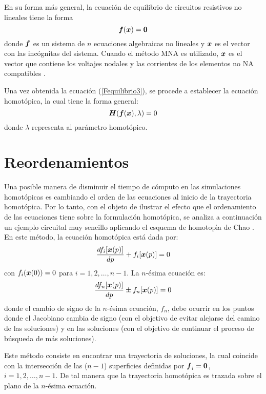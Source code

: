 \documentclass[conference,letterpaper,onecolumn]{IEEEtran}
\newcommand{\pig}[1]{\mbox{\boldmath ${#1}$}	}
\begin{document}
En su forma m\'as general, la ecuaci\'on de equilibrio de circuitos
resistivos no lineales tiene la forma
\begin{equation}
\pig{f}(\pig{x})=\pig{0}
\label{Fequilibrio3}
\end{equation}
donde $\pig{f}$ es un sistema de $n$ ecuaciones algebraicas no lineales
y $\pig{x}$  es el vector con las inc\'ognitas del sistema. Cuando el
m\'etodo MNA es utilizado, $\pig{x}$ es el vector que contiene los
voltajes nodales y las corrientes de los elementos no NA compatibles
\cite{Schwa_book}.

Una vez obtenida la ecuaci\'on (\ref{Fequilibrio3}), se procede a establecer
la ecuaci\'on homot\'opica, la cual tiene la forma general:
\begin{equation}
\pig{H}(\pig{f}(\pig{x}),\lambda )=0
\label{homotopia3}
\end{equation}
donde $\lambda$ representa al par\'ametro homot\'opico.

\section{Reordenamientos}

Una posible manera de disminuir el tiempo de c\'omputo en las simulaciones homot\'opicas es cambiando
el orden de las ecuaciones al inicio de la trayectoria homot\'opica. Por lo tanto, con el objeto de ilustrar el efecto que el ordenamiento
de las ecuaciones tiene sobre la formulaci\'on homot\'opica, se analiza
a continuaci\'on un ejemplo circuital muy sencillo aplicando el esquema
de homotop\'{\i}a de Chao \cite{cont_kao}. En este m\'etodo, la ecuaci\'on homot\'opica est\'a dada por:
\begin{equation}
{ {{d f_i[\pig{x}(p)]} \over{dp}} + f_i[\pig{x}(p)]=0}
\label{chao}
\end{equation}
con $f_i(\pig{x}(0))=0$ para $i=1,2,\ldots,n-1$.
La $n$-\'esima ecuaci\'on es:
\begin{equation}
{  {{d f_n [\pig{x}(p)]} \over {dp} } \pm f_n [\pig{x}(p)]=0}
\label{chao2}
\end{equation}
donde el cambio de signo de la $n$-\'esima ecuaci\'on, $f_n$, debe
ocurrir en los puntos donde el Jacobiano cambia de signo (con el
objetivo de evitar alejarse del camino de las soluciones) y en las
soluciones (con el objetivo de continuar el proceso de b\'usqueda
de m\'as soluciones).

Este m\'etodo consiste en encontrar una trayectoria de soluciones,
la cual coincide con la intersecci\'on de las ($n-1$) superficies
definidas por $\pig{f}_i=\pig{0}$, $i=1, 2, \ldots, n-1$. De tal manera
que la trayectoria homot\'opica es trazada sobre el plano de la
$n$-\'esima ecuaci\'on.
\end{document}
